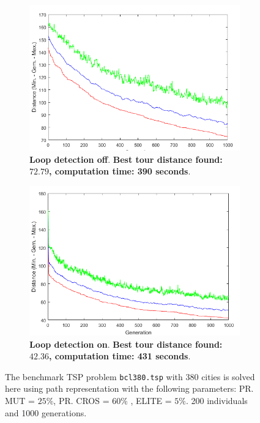  
  \begin{figure}[!]
\centering
\begin{subfigure}{0.45\textwidth}
  \centering
  \includegraphics[width=1\textwidth]{../figures/question_5/FPS_off_gens.png}
      \caption{\textbf{Loop detection off}. \textbf{Best tour distance found: $\mathbf{72.79}$, computation time: 390 seconds}. } 
      \label{fig:fps_vraag5_off_gen}
\end{subfigure}
\hspace{0.05\textwidth}
\begin{subfigure}{0.45\textwidth}
  \centering
  \includegraphics[width=1\textwidth]{../figures/question_5/FPS_on_gens.png}
      \caption{\textbf{Loop detection on}.  \textbf{Best tour distance found: $\mathbf{42.36}$, computation time: 431 seconds}.} 
      \label{fig:fps_vraag5_off_gen}
\end{subfigure}
\caption{The benchmark TSP problem \texttt{bcl380.tsp} with 380 cities is solved here using path representation with the following parameters: PR. MUT = $25\%$, PR. CROS = $60\%$ , ELITE = $5\%$. 200 individuals and 1000 generations.}
\label{fig:fps_gen}
\end{figure}


